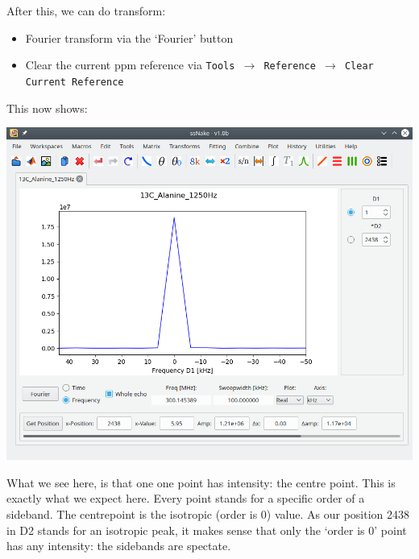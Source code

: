 \documentclass[11pt,a4paper]{article}
\begin{document}
After this, we can do transform:
\begin{itemize}
  \item Fourier transform via the `Fourier' button
  \item Clear the current ppm reference via \texttt{Tools $\longrightarrow$ Reference
	 $\longrightarrow$ Clear Current Reference}
\end{itemize}
This now shows:
\begin{center}
\includegraphics[width=0.8\linewidth]{Figs/Fig3.png}
\end{center}
What we see here, is that one one point has intensity: the centre point. This is exactly what we
expect here. Every point stands for a specific order of a sideband. The centrepoint is the isotropic
(order is 0) value. As our position 2438 in D2 stands for an isotropic peak, it makes sense that
only the `order is 0' point has any intensity: the sidebands are spectate.
\end{document}
